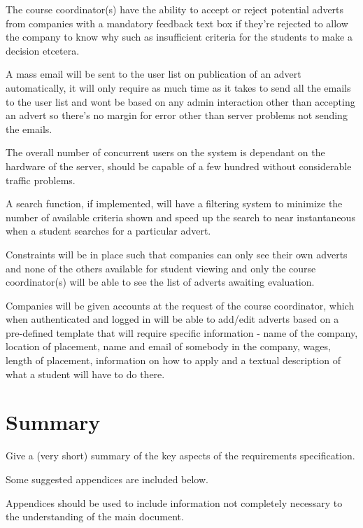 \documentclass{l3deliverable}
\begin{document}
The course coordinator(s) have the ability to accept or reject potential adverts
from companies with a mandatory feedback text box if they're rejected to allow
the company to know why such as insufficient criteria for the students to make a
decision etcetera.

A mass email will be sent to the user list on publication of an advert
automatically, it will only require as much time as it takes to send all the
emails to the user list and wont be based on any admin interaction other than
accepting an advert so there's no margin for error other than server problems
not sending the emails.

The overall number of concurrent users on the system is dependant on the
hardware of the server, should be capable of a few hundred without considerable
traffic problems.

A search function, if implemented, will have a filtering system to minimize the
number of available criteria shown and speed up the search to near instantaneous
when a student searches for a particular advert.

Constraints will be in place such that companies can only see their own adverts
and none of the others available for student viewing and only the course
coordinator(s) will be able to see the list of adverts awaiting evaluation.

Companies will be given accounts at the request of the course coordinator, which
when authenticated and logged in will be able to add/edit adverts based on a
pre-defined template that will require specific information - name of the
company, location of placement, name and email of somebody in the company,
wages, length of placement, information on how to apply and a textual
description of what a student will have to do there.


\section{Summary}

Give a (very short) summary of the key aspects of the requirements
specification.


\appendix

Some suggested appendices are included below.

Appendices should be used to include information not completely
necessary to the understanding of the main document.
\end{document}

